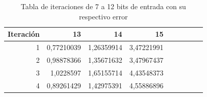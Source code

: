 \begin{table}[htbp]
  \centering
  \caption{Tabla de iteraciones de 7 a 12 bits de entrada con su respectivo error}
    \begin{tabular}{rrrrrrrrr}
    \toprule
    Iteración     & 13    & 14    & 15 \\
    \midrule
    1    &    0,77210039 & 1,26359914 & 3,47221991 \\
    2    &    0,98878366 & 1,35671632 & 3,47967437 \\
    3    &    1,0228597 & 1,65155714 & 4,43548373 \\
    4    &    0,89261429 & 1,42975391 & 4,55886896 \\
    \bottomrule
    \end{tabular}%
  \label{tab:errores2}%
\end{table}%
